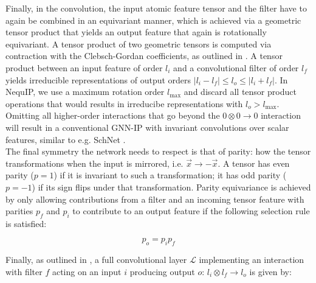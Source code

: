 \documentclass[%
reprint,
superscriptaddress,
nofootinbib,
amsmath,amssymb,
aps,
prl,
]{revtex4-1}
\begin{document}
Finally, in the convolution, the input atomic feature tensor and the filter have to again be combined in an equivariant manner, which is achieved via a geometric tensor product that yields an output feature that again is rotationally equivariant. A tensor product of two geometric tensors is computed via contraction with the Clebsch-Gordan coefficients, as outlined in \cite{thomas2018tensor}. A tensor product between an input feature of order $l_i$ and a convolutional filter of order $l_f$ yields irreducible representations of output orders $|l_i - l_f| \leq l_o \leq |l_i + l_f| $. In NequIP, we use a maximum rotation order $l_{\text{max}}$ and discard all tensor product operations that would results in irreducibe representations with $l_o > l_{\text{max}}$. Omitting all higher-order interactions that go beyond the $0 \otimes 0 \rightarrow 0$ interaction will result in a conventional GNN-IP with invariant convolutions over scalar features, similar to e.g. SchNet \cite{schnet_neurips}.\\

The final symmetry the network needs to respect is that of parity: how the tensor transformations when the input is mirrored, i.e. $\vec{x} \rightarrow -\vec{x}$. A tensor has even parity ($p = 1$) if it is invariant to such a transformation; it has odd parity ($p = -1$) if its sign flips under that transformation. Parity equivariance is achieved by only allowing contributions from a filter and an incoming tensor feature with  parities $p_f$ and $p_i$ to contribute to an output feature if the following selection rule is satisfied:

\begin{equation}
    p_o = p_i p_f
\end{equation}

Finally, as outlined in \cite{thomas2018tensor}, a full convolutional layer $\mathcal{L}$ implementing an interaction with filter $f$ acting on an input $i$ producing output $o$: $l_i \otimes l_f  \rightarrow l_o$ is given by: 
\end{document}
